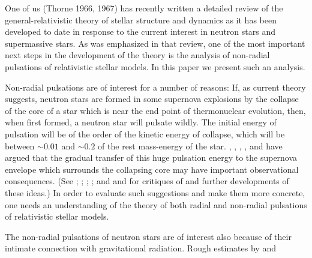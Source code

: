 One of us (Thorne 1966, 1967) has recently written a detailed review of the general-relativistic
theory of stellar structure and dynamics as it has been developed to date in response to the current
interest in neutron stars and supermassive stars. As was emphasized in that review, one of the most
important next steps in the development of the theory is the analysis of non-radial pulsations of
relativistic stellar models. In this paper we present such an analysis.

Non-radial pulsations are of interest for a number of reasons: If, as current theory suggests,
neutron stars are formed in some supernova explosions by the collapse of the core of a star which is
near the end point of thermonuclear evolution, then, when first formed, a neutron star will pulsate
wildly. The initial energy of pulsation will be of the order of the kinetic energy of collapse, which
will be between $\sim 0.01$ and $\sim 0.2$ of the rest mass-energy of the star.
\cite{Hoyle1964}, \cite{Narikiar1964}, \cite{Cameron1965a}, \cite{Cameron1965b}, and \cite{Finzi1965}
have argued that the gradual transfer of this huge pulsation energy to the supernova envelope which surrounds the collapsing core may have important observational consequences.
(See \cite{Wheeler1966}; \cite{Meltzer1966}; \cite{Thorne1966}; \cite{Finzi1966}; and
\cite{Tsuruta1966} and \cite{Cameron1966} for critiques of and further developments of these ideas.)
In order to evaluate such suggestions and make them more concrete, one needs an understanding of the
theory of both radial and non-radial pulsations of relativistic stellar models.

The non-radial pulsations of neutron stars are of interest also because of their intimate connection
with gravitational radiation. Rough estimates by \cite{Zee1966} and \cite{Wheeler1966}
